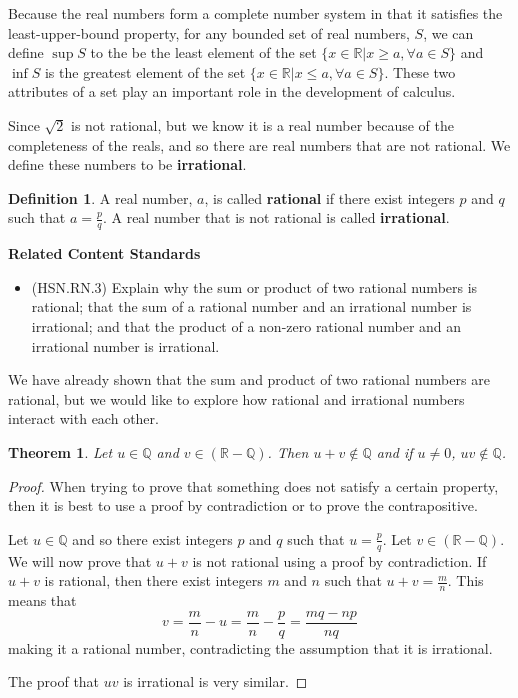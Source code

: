 \documentclass[
]{book}
\providecommand{\tightlist}{%
  \setlength{\itemsep}{0pt}\setlength{\parskip}{0pt}}
\newenvironment{standards}{}{}
\newtheorem{theorem}{Theorem}[chapter]
\theoremstyle{definition}
\newtheorem{definition}{Definition}[chapter]
\theoremstyle{definition}
\theoremstyle{definition}
\theoremstyle{definition}
\theoremstyle{remark}
\begin{document}
Because the real numbers form a complete number system in that it satisfies the least-upper-bound property, for any bounded set of real numbers, \(S\), we can define \(\sup S\) to the be the least element of the set \(\{ x \in \mathbb{R} \vert x\geq a, \forall a\in S\}\) and \(\inf S\) is the greatest element of the set \(\{x\in \mathbb{R} \vert x\leq a, \forall a\in S\}\). These two attributes of a set play an important role in the development of calculus.

Since \(\sqrt{2}\) is not rational, but we know it is a real number because of the completeness of the reals, and so there are real numbers that are not rational. We define these numbers to be \textbf{irrational}.

\begin{definition}
A real number, \(a\), is called \textbf{rational} if there exist integers \(p\) and \(q\) such that \(a=\frac{p}{q}\). A real number that is not rational is called \textbf{irrational}.
\end{definition}

\begin{standards}

\begin{center}
\textbf{Related Content Standards}

\end{center}

\begin{itemize}
\tightlist
\item
  (HSN.RN.3) Explain why the sum or product of two rational numbers is rational; that the sum of a rational number and an irrational number is irrational; and that the product of a non-zero rational number and an irrational number is irrational.
\end{itemize}

\end{standards}

We have already shown that the sum and product of two rational numbers are rational, but we would like to explore how rational and irrational numbers interact with each other.

\begin{theorem}
Let \(u\in \mathbb{Q}\) and \(v\in (\mathbb{R}-\mathbb{Q})\). Then \(u+v\notin \mathbb{Q}\) and if \(u\neq 0\), \(uv\notin \mathbb{Q}\).
\end{theorem}

\begin{proof}
When trying to prove that something does not satisfy a certain property, then it is best to use a proof by contradiction or to prove the contrapositive.

Let \(u\in \mathbb{Q}\) and so there exist integers \(p\) and \(q\) such that \(u=\frac{p}{q}\). Let \(v\in (\mathbb{R}-\mathbb{Q})\). We will now prove that \(u+v\) is not rational using a proof by contradiction. If \(u+v\) is rational, then there exist integers \(m\) and \(n\) such that \(u+v=\frac{m}{n}\). This means that \[v= \frac{m}{n}-u = \frac{m}{n}-\frac{p}{q} = \frac{mq-np}{nq}\] making it a rational number, contradicting the assumption that it is irrational.

The proof that \(uv\) is irrational is very similar.
\end{proof}
\end{document}
